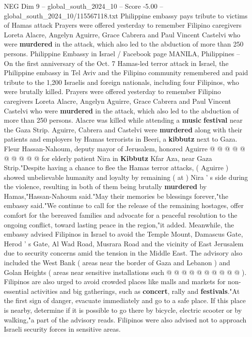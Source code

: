 \begin{textsample}{NEG Dim 9 – global\_south\_2024\_10 – Score -5.00 – global\_south\_2024\_10/115567118.txt}  \label{ex:f9_neg_280}
Philippine embassy pays tribute to victims of Hamas attack Prayers were offered yesterday to remember Filipino caregivers Loreta Alacre, Angelyn Aguirre, Grace Cabrera and Paul Vincent Castelvi who were \textbf{murdered} in the attack, which also led to the abduction of more than 250 persons.
Philippine Embassy in Israel / Facebook page MANILA, Philippines -- On the first anniversary of the Oct. 7 Hamas-led terror attack in Israel, the Philippine embassy in Tel Aviv and the Filipino community remembered and paid tribute to the 1,200 Israelis and foreign nationals, including four Filipinos, who were brutally killed.
Prayers were offered yesterday to remember Filipino caregivers Loreta Alacre, Angelyn Aguirre, Grace Cabrera and Paul Vincent Castelvi who were \textbf{murdered} in the attack, which also led to the abduction of more than 250 persons.
Alacre was killed while attending a \textbf{music} \textbf{festival} near the Gaza Strip.
Aguirre, Cabrera and Castelvi were \textbf{murdered} along with their patients and employers by Hamas terrorists in Beeri, a \textbf{kibbutz} next to Gaza.
Fleur Hassan-Nahoum, deputy mayor of Jerusalem, honored Aguirre @ @ @ @ @ @ @ @ @ @ for elderly patient Nira in \textbf{Kibbutz} Kfar Aza, near Gaza Strip."Despite having a chance to flee the Hamas terror attacks, ( Aguirre ) showed unbelievable humanity and loyalty by remaining ( at ) Nira ' s side during the violence, resulting in both of them being brutally \textbf{murdered} by Hamas,"Hassan-Nahoum said."May their memories be blessings forever,"the embassy said."We continue to call for the release of the remaining hostages, offer comfort for the bereaved families and advocate for a peaceful resolution to the ongoing conflict, toward lasting peace in the region,"it added.
Meanwhile, the embassy advised Filipinos in Israel to avoid the Temple Mount, Damascus Gate, Herod ' s Gate, Al Wad Road, Musrara Road and the vicinity of East Jerusalem due to security concerns amid the tension in the Middle East.
The advisory also included the West Bank ( areas near the border of Gaza and Lebanon ) and Golan Heights ( areas near sensitive installations such @ @ @ @ @ @ @ @ @ @ ).
Filipinos are also urged to avoid crowded places like malls and markets for non-essential activities and big gatherings, such as \textbf{concert}, rally and \textbf{festivals}."At the first sign of danger, evacuate immediately and go to a safe place.
If this place is nearby, determine if it is possible to go there by bicycle, electric scooter or by walking,"a part of the advisory reads.
Filipinos were also advised not to approach Israeli security forces in sensitive areas.

\end{textsample}
